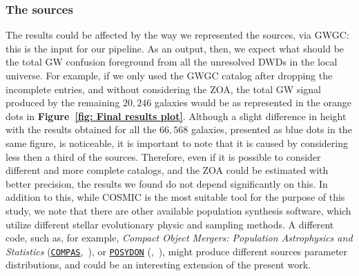 \subsubsection{The sources}
The results could be affected by the way we represented the sources, via GWGC: this is the input for our pipeline. 
As an output, then, we expect what {should} be the total GW confusion foreground from all the unresolved DWDs in the local universe.
For example, if we only used the GWGC catalog after dropping the incomplete entries, and without considering the ZOA, the total GW signal produced by the remaining $20,246$ galaxies would be as represented in the orange dots in \textbf{Figure~\ref{fig: Final results plot}}.
Although a slight difference in height with the results obtained for all the $66,568$ galaxies, presented as blue dots in the same figure, is noticeable, it is important to note that it is caused by considering less then a third of the sources.
Therefore, even if it is possible to consider different and more complete catalogs, and the ZOA could be estimated with better precision, the results we found do not depend significantly on this.
In addition to this, while COSMIC is the most suitable tool for the purpose of this study, we note that there are other available population synthesis software, which utilize different stellar evolutionary physic and sampling methods.
A different code, such as, for example, \textit{Compact Object Mergers: Population Astrophysics and Statistics} (\underline{\href{https://compas.readthedocs.io/en/latest/}{\texttt{COMPAS}}},~\cite{Riley_2022}), or \texttt{\underline{\href{https://github.com/POSYDON-code/POSYDON}{POSYDON}}} (\cite{POSYDON_1},~\cite{POSYDON_2}), might produce different sources parameter distributions, and could be an interesting extension of the present work.

